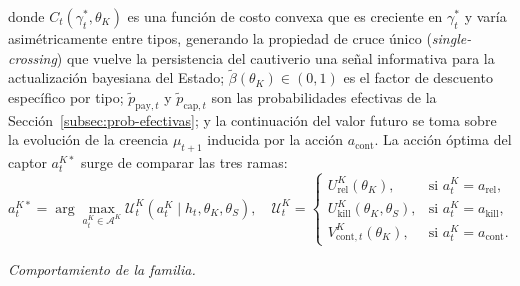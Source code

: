 \documentclass[pdflatex,sn-mathphys-ay]{sn-jnl}
\theoremstyle{thmstyleone}
\theoremstyle{thmstyletwo}
\theoremstyle{thmstylethree}
\newcommand{\1}{\mathbf{1}}
\begin{document}
donde $C_t(\gamma_t^\ast,\theta_K)$ es una función de costo convexa que es creciente en $\gamma_t^\ast$ y varía asimétricamente entre tipos, generando la propiedad de cruce único (\textit{single-crossing}) que vuelve la persistencia del cautiverio una señal informativa para la actualización bayesiana del Estado; $\tilde{\beta}(\theta_K)\in(0,1)$ es el factor de descuento específico por tipo; $\tilde{p}_{\mathrm{pay},t}$ y $\tilde{p}_{\mathrm{cap},t}$ son las probabilidades efectivas de la Sección~\ref{subsec:prob-efectivas}; y la continuación del valor futuro se toma sobre la evolución de la creencia $\mu_{t+1}$ inducida por la acción $a_{\mathrm{cont}}$. La acción óptima del captor $a_t^{K\ast}$ surge de comparar las tres ramas:
\begin{equation}
a_t^{K\ast}=\arg\max_{a_t^K\in\mathcal{A}^K}\mathcal{U}^K_t(a_t^K\mid h_t,\theta_K,\theta_S),\quad
\mathcal{U}^K_t=\begin{cases}U^K_{\mathrm{rel}}(\theta_K), & \text{si }a_t^K=a_{\mathrm{rel}},\\U^K_{\mathrm{kill}}(\theta_K,\theta_S), & \text{si }a_t^K=a_{\mathrm{kill}},\\V^K_{\mathrm{cont},t}(\theta_K), & \text{si }a_t^K=a_{\mathrm{cont}}.\end{cases}
\label{eq:k-argmax}
\end{equation}

\noindent\textit{Comportamiento de la familia.}
\end{document}
